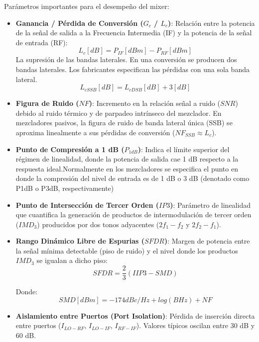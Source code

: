 \documentclass[11pt,a4paper,twoside]{report}
\begin{document}
	Parámetros importantes para el desempeño del mixer:
	\begin{itemize}
		\item \textbf{Ganancia / Pérdida de Conversión ($G_c$ / $L_c$)}: Relación entre la potencia de la señal de salida a la Frecuencia Intermedia (IF) y la potencia de la señal de entrada (RF):
		\begin{equation}
			L_c[dB] = P_{IF}[dBm] - P_{RF}[dBm]
		\end{equation}
		La supresión de las bandas laterales. En una conversión se producen dos bandas
		laterales. Los fabricantes especifican las pérdidas con una sola banda lateral. 
		\begin{equation}
			L_{cSSB}[dB] = L_{cDSB}[dB] +3[dB]
		\end{equation}
		
		\item \textbf{Figura de Ruido ($NF$)}: Incremento en la relación señal a ruido ($SNR$) debido al ruido térmico y de parpadeo intrínseco del mezclador. En mezcladores pasivos, la figura de ruido de banda lateral única (SSB) se aproxima linealmente a sus pérdidas de conversión ($NF_{SSB} \approx L_c$).\newpage
		
		\item \textbf{Punto de Compresión a 1 dB ($P_{1dB}$)}: Indica el límite superior del régimen de linealidad, donde la potencia de salida cae 1 dB respecto a la respuesta ideal.Normalmente en los mezcladores se especifica el punto en donde la compresión del nivel de entrada es de 1 dB o 3 dB (denotado como P1dB o P3dB, respectivamente)
		
		\item \textbf{Punto de Intersección de Tercer Orden ($IP3$)}: Parámetro de linealidad que cuantifica la generación de productos de intermodulación de tercer orden ($IMD_3$) producidos por dos tonos adyacentes ($2f_1 - f_2$ y $2f_2 - f_1$).
		
		\item \textbf{Rango Dinámico Libre de Espurias ($SFDR$)}: Margen de potencia entre la señal mínima detectable (piso de ruido) y el nivel donde los productos $IMD_3$ se igualan a dicho piso:
		\begin{equation}
			SFDR = \frac{2}{3} (IIP3 - SMD)
		\end{equation}
		
		Donde:
		\begin{equation}
			SMD [dBm] = -174dBc/Hz + log (BHz) + NF
		\end{equation}
		
		\item \textbf{Aislamiento entre Puertos (Port Isolation)}: Pérdida de inserción directa entre puertos ($I_{LO-RF}$, $I_{LO-IF}$, $I_{RF-IF}$). Valores típicos oscilan entre 30 dB y 60 dB. 
	\end{itemize}
	
\end{document}
